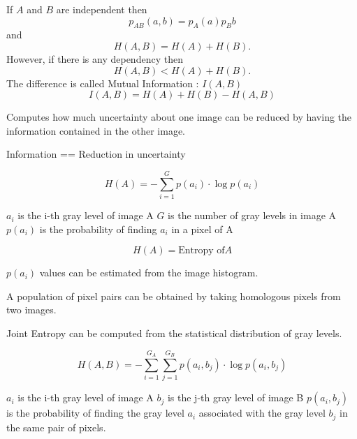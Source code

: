 If $A$ and $B$ are independent then
\begin{equation}
p_{AB}(a,b) = p_A(a) p_B{b}
\end{equation}
and
\begin{equation}
H(A,B) = H(A) + H(B).
\end{equation}
However, if there is any dependency then
\begin{equation}
H(A,B)<H(A)+H(B).
\end{equation}
The difference is called Mutual Information : \( I(A,B) \)
\begin{equation}
I(A,B)=H(A)+H(B)-H(A,B)
\end{equation}


Computes how much uncertainty about one image can be
reduced by having the information contained in the other
image.

Information == Reduction in uncertainty

\begin{equation}
H(A)=-\sum _{i=1}^{G}p(a_{i})\cdot \log p(a_{i})
\end{equation}

\begin{center}
$a_{i}$ is the i-th gray level of image A
$G$ is the number of gray levels in image A
$p(a_{i})$ is the probability of finding $a_{i}$ in a pixel of A
\end{center}

\begin{equation}
H(A) = \mbox{Entropy of} A
\end{equation}

$p(a_{i})$ values can be estimated from the image histogram.

A population of pixel pairs can be obtained by taking homologous pixels from
two images.

Joint Entropy can be computed from the statistical distribution of gray levels.

\begin{equation}
H(A,B)=-\sum _{i=1}^{G_{A}}\sum _{j=1}^{G_{B}}p\left( a_{i},b_{j}\right) \cdot \log p\left( a_{i},b_{j}\right)
\end{equation}


\begin{center}
$a_{i}$ is the i-th gray level of image A
$b_{j}$ is the j-th gray level of image B $p\left( a_{i},b_{j}\right)$ is the
probability of finding the gray level $a_{i}$ associated with the gray level
$b_{j}$ in the same pair of pixels.
\end{center}


